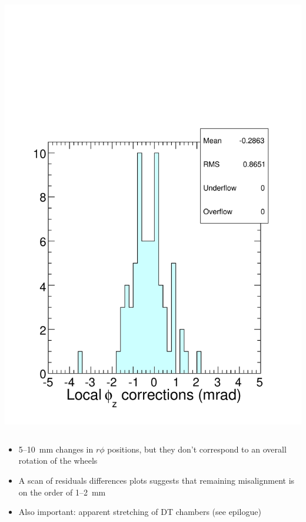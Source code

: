 \documentclass[compress]{beamer}
\begin{document}
\begin{frame}
\begin{columns}
\includegraphics[width=\linewidth]{corrections_phiz.pdf}
\end{columns}

\vfill
\begin{itemize}
\item 5--10~mm changes in $r\phi$ positions, but they don't correspond to an overall rotation of the wheels

\item A scan of residuals differences plots suggests that remaining misalignment is on the order of 1--2~mm

\item Also important: apparent stretching of DT chambers (see epilogue)
\end{itemize}
\end{frame}

\end{document}
